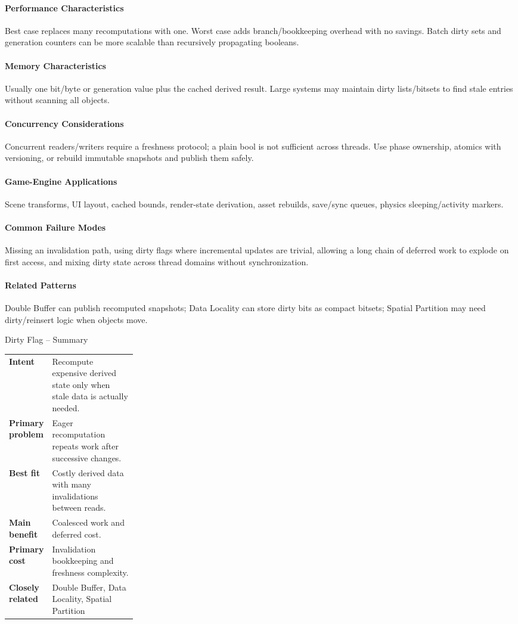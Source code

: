 \documentclass[11pt]{article}
\begin{document}
\paragraph{Performance Characteristics} Best case replaces many recomputations with one. Worst case adds branch/bookkeeping overhead with no savings. Batch dirty sets and generation counters can be more scalable than recursively propagating booleans.
\paragraph{Memory Characteristics} Usually one bit/byte or generation value plus the cached derived result. Large systems may maintain dirty lists/bitsets to find stale entries without scanning all objects.
\paragraph{Concurrency Considerations} Concurrent readers/writers require a freshness protocol; a plain bool is not sufficient across threads. Use phase ownership, atomics with versioning, or rebuild immutable snapshots and publish them safely.
\paragraph{Game-Engine Applications} Scene transforms, UI layout, cached bounds, render-state derivation, asset rebuilds, save/sync queues, physics sleeping/activity markers.
\paragraph{Common Failure Modes} Missing an invalidation path, using dirty flags where incremental updates are trivial, allowing a long chain of deferred work to explode on first access, and mixing dirty state across thread domains without synchronization.
\paragraph{Related Patterns} Double Buffer can publish recomputed snapshots; Data Locality can store dirty bits as compact bitsets; Spatial Partition may need dirty/reinsert logic when objects move.

\begin{patternsummary}{Dirty Flag -- Summary}
\begin{tabularx}{\linewidth}{@{}>{\bfseries}p{0.25\linewidth}X@{}}
Intent & Recompute expensive derived state only when stale data is actually needed. \\
Primary problem & Eager recomputation repeats work after successive changes. \\
Best fit & Costly derived data with many invalidations between reads. \\
Main benefit & Coalesced work and deferred cost. \\
Primary cost & Invalidation bookkeeping and freshness complexity. \\
Closely related & Double Buffer, Data Locality, Spatial Partition \\
\end{tabularx}
\end{patternsummary}
\end{document}

